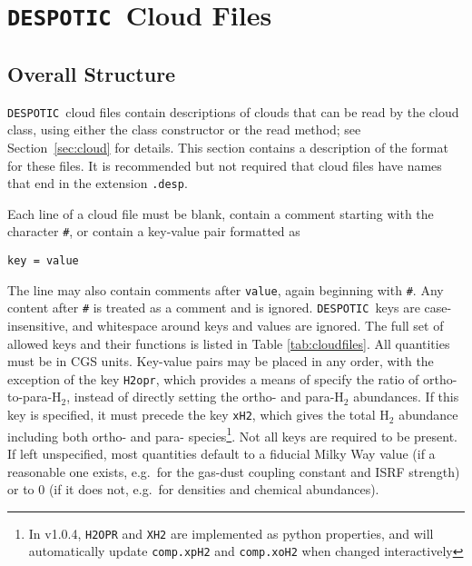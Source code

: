\documentclass[12pt]{article}
\newcommand{\despotic}{\texttt{DESPOTIC}}
\begin{document}
\clearpage

\section{\despotic\ Cloud Files}
\label{sec:cloudfiles}

\subsection{Overall Structure}

\despotic\ cloud files contain descriptions of clouds that can be read by the cloud class, using either the class constructor or the read method; see Section~\ref{sec:cloud} for details. This section contains a description of the format for these files. It is recommended but not required that cloud files have names that end in the extension \verb=.desp=.

Each line of a cloud file must be blank, contain a comment starting with the character \verb=#=, or contain a key-value pair formatted as
\begin{verbatim}
key = value
\end{verbatim}
The line may also contain comments after \verb=value=, again beginning with \verb=#=. Any content after \verb=#= is treated as a comment and is ignored. \despotic\ keys are case-insensitive, and whitespace around keys and values are ignored. The full set of allowed keys and their functions is listed in Table \ref{tab:cloudfiles}. All quantities must be in CGS units. Key-value pairs may be placed in any order, with the exception of the key \verb=H2opr=, which provides a means of specify the ratio of ortho-to-para-H$_2$, instead of directly setting the ortho- and para-H$_2$ abundances. If this key is specified, it must precede the key \verb=xH2=, which gives the total H$_2$ abundance including both ortho- and para- species\footnote{In v1.0.4, \texttt{H2OPR} and \texttt{XH2} are implemented as python properties, and will automatically update \texttt{comp.xpH2} and \texttt{comp.xoH2} when changed interactively}. Not all keys are required to be present. If left unspecified, most quantities default to a fiducial Milky Way value (if a reasonable one exists, e.g.~for the gas-dust coupling constant and ISRF strength) or to 0 (if it does not, e.g.~for densities and chemical abundances).
\end{document}
